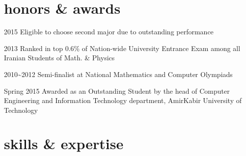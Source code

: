 \documentclass[]{friggeri-cv} %
\begin{document}

\section{honors \& awards}

\begin{entrylist}


\entry
{2015}
{{\normalfont Eligible to choose} \textcolor{TextGreen}{second major} {\normalfont due to outstanding performance}}
{}
{}


\entry
{2013}
{\normalfont Ranked in top 0.6\% of Nation-wide University Entrance Exam among all Iranian Students of Math. \& Physics}
{}
{}


\entry
{2010\textasciitilde 2012}
{\textcolor{TextOrange}{Semi-finalist} {\normalfont at National Mathematics and Computer Olympiads}}
{}
{}


\entry
{Spring 2015}
{\normalfont Awarded as an Outstanding Student by the head of Computer Engineering and Information Technology department, AmirKabir University of Technology}
{}
{}

\end{entrylist}


\section{skills \& expertise}
\end{document}
